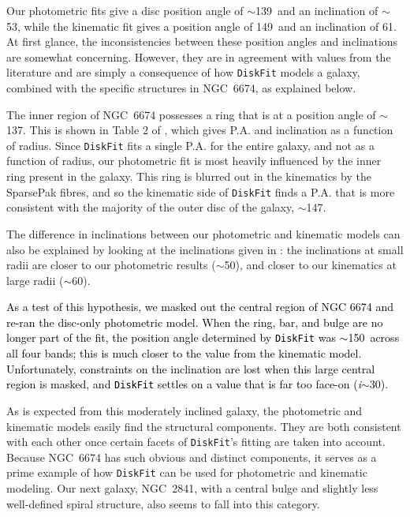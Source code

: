 \documentclass[a4paper,fleqn,usenatbib]{mnras}
\newcommand{\authorfix}{\textcolor{black}}
\begin{document}
Our photometric fits give a disc position angle of $\sim$139\degr\ and an inclination of $\sim$53\degr, while the kinematic fit gives a position angle of 149\degr\ and an inclination of 61\degr. At first glance, the inconsistencies between these position angles and inclinations are somewhat concerning. However, they are in agreement with values from the literature and are simply a consequence of how \texttt{DiskFit} models a galaxy, combined with the specific structures in NGC~6674, as explained below. 

The inner region of NGC~6674 possesses a ring that is at a position angle of $\sim$137\degr. This is shown in Table 2 of \citet{boreils1991}, which gives P.A. and inclination as a function of radius. Since \texttt{DiskFit} fits a single P.A. for the entire galaxy, and not as a function of radius, our photometric fit is most heavily influenced by the inner ring present in the galaxy. This ring is blurred out in the kinematics by the SparsePak fibres, and so the kinematic side of \texttt{DiskFit} finds a P.A. that is more consistent with the majority of the outer disc of the galaxy, $\sim$147\degr. 

The difference in inclinations between our photometric and kinematic models can also be explained by looking at the inclinations given in \citet{boreils1991}: the inclinations at small radii are closer to our photometric results ($\sim$50\degr), and closer to our kinematics at large radii ($\sim$60\degr). 

\authorfix{As a test of this hypothesis, we masked out the central region of NGC 6674 and re-ran the disc-only photometric model. When the ring, bar, and bulge are no longer part of the fit, the position angle determined by \texttt{DiskFit} was $\sim$150\degr\ across all four bands; this is much closer to the value from the kinematic model. Unfortunately, constraints on the inclination are lost when this large central region is masked, and \texttt{DiskFit} settles on a value that is far too face-on (\textit{i}$\sim$30\degr).}

As is expected from this moderately inclined galaxy, the photometric and kinematic models easily find the structural components. They are both consistent with each other once certain facets of \texttt{DiskFit}'s fitting are taken into account. Because NGC~6674 has such obvious and distinct components, it serves as a prime example of how \texttt{DiskFit} can be used for photometric and kinematic modeling. Our next galaxy, NGC~2841, with a central bulge and slightly less well-defined spiral structure, also seems to fall into this category.
\end{document}
